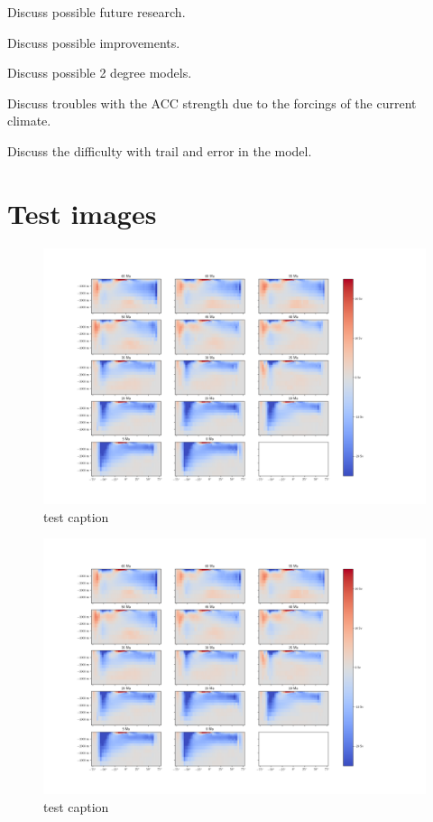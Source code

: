 \documentclass[a4paper]{article}
\begin{document}
\begin{multicols}{2}
Discuss possible future research.

Discuss possible improvements.

Discuss possible 2 degree models.

Discuss troubles with the ACC strength due to the forcings of the current climate.

Discuss the difficulty with trail and error in the model.



\section{Test images}
\begin{figure}[H]
	\includegraphics[width=\linewidth]{overturning_overview.png}
	\caption{test caption}
	\label{fig:example1}
\end{figure}
\end{multicols}
\begin{figure}[H]
	\includegraphics[width=\linewidth]{overturning_overview.png}
	\caption{test caption}
	\label{fig:example1}
\end{figure}

\begin{multicols}{2}

\printbibliography

\end{multicols}
\end{document}
